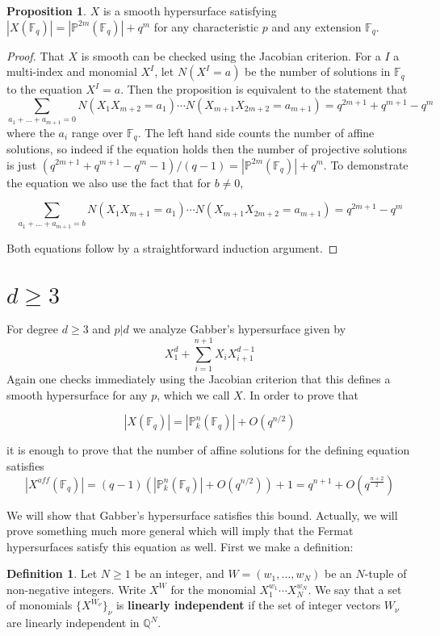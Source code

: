 \documentclass{ucbthesis}
\theoremstyle{definition}
\newtheorem{defn}[thm]{Definition}
\theoremstyle{theorem}
\newtheorem{prop}[thm]{Proposition}
\begin{document}
\begin{prop}
$X$ is a smooth hypersurface satisfying $|X(\mathbb{F}_{q})| = |\mathbb{P}^{2m}(\mathbb{F}_{q})| + q^{m}$ for any characteristic $p$ and any extension $\mathbb{F}_{q}$.
\end{prop}
\begin{proof}
That $X$ is smooth can be checked using the Jacobian criterion. For a $I$ a multi-index and monomial $X^{I}$, let $N(X^{I}=a)$ be the number of solutions in $\mathbb{F}_{q}$ to the equation  $X^{I}=a$. Then the proposition is equivalent to the statement that 
$$\sum\limits_{a_{1} + \ldots + a_{m+1} = 0}N(X_{1}X_{m+2}=a_{1})\cdots N(X_{m+1}X_{2m+2}=a_{m+1}) = q^{2m+1} + q^{m+1} - q^{m}$$
where the $a_{i}$ range over $\mathbb{F}_{q}$. The left hand side counts the number of affine solutions, so indeed if the equation holds then the number of projective solutions is just $(q^{2m+1} + q^{m+1} - q^{m} -1)/(q-1) = |\mathbb{P}^{2m}(\mathbb{F}_{q})| + q^{m}$. To demonstrate the equation we also use the fact that for $b\neq 0$, 

$$\sum\limits_{a_{1} + \ldots + a_{m+1} = b}N(X_{1}X_{m+1}=a_{1})\cdots N(X_{m+1}X_{2m+2}=a_{m+1}) = q^{2m+1} - q^{m}$$

Both equations follow by a straightforward induction argument.
\end{proof}

\section{$d\geq 3$}
For degree $d\geq 3$ and $p|d$ we analyze Gabber's hypersurface given by 
$$X_{1}^{d} + \sum\limits_{i=1}^{n+1}X_{i}X_{i+1}^{d-1}$$
Again one checks immediately using the Jacobian criterion that this defines a smooth hypersurface for any $p$, which we call $X$. In order to prove that 

$$|X(\mathbb{F}_{q})| = |\mathbb{P}_{k}^{n}(\mathbb{F}_{q})| + O(q^{n/2})$$

it is enough to prove that the number of affine solutions for the defining equation satisfies 
$$|X^{aff}(\mathbb{F}_{q})| = (q-1)(|\mathbb{P}_{k}^{n}(\mathbb{F}_{q})| + O(q^{n/2}))+1 = q^{n+1} + O(q^{\frac{n+2}{2}})$$

We will show that Gabber's hypersurface satisfies this bound. Actually, we will prove something much more general which will imply that the Fermat hypersurfaces satisfy this equation as well. First we make a definition:

\begin{defn}
Let $N\geq 1$ be an integer, and $W=(w_1,\ldots,w_N)$ be an $N$-tuple of non-negative integers. Write $X^{W}$ for the monomial $X_{1}^{w_{1}}\cdots X_{N}^{w_{N}}$. We say that a set of monomials $\{X^{W_{\nu}}\}_{\nu}$ is \textbf{linearly independent} if the set of integer vectors $W_{\nu}$ are linearly independent in $\mathbb{Q}^N$. 
\end{defn}
\end{document}
